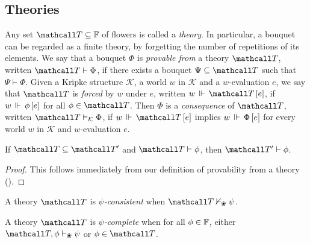 
\subsection{Theories}

\begin{definition}[Theory] 
  
  Any set $\tT \subseteq \flowers$ of flowers is called a \emph{theory}. In
  particular, a bouquet can be regarded as a finite theory, by forgetting the
  number of repetitions of its elements. We say that a bouquet $\Phi$ is
  \emph{provable from} a theory $\tT$, written $\tT \vdash \Phi$, if there exists a
  bouquet $\Psi \subseteq \tT$ such that $\Psi \vdash \Phi$. Given a Kripke
  structure $\mathcal{K}$, a world $w$ in $\mathcal{K}$ and a $w$-evaluation
  $e$, we say that $\tT$ is \emph{forced} by $w$ under $e$, written
  $\eforces{w}{\tT}{e}$, if $w\,\Vdash\,\phi\,[e]$ for all $\phi \in \tT$. Then
  $\Phi$ is a \emph{consequence} of $\tT$, written $\tT \vDash_{\mathcal{K}} \Phi$,
  if $\eforces{w}{\tT}{e}$ implies $w\,\Vdash\,\Phi\,[e]$ for every world $w$ in
  $\mathcal{K}$ and $w$-evaluation $e$.
\end{definition}

\begin{lemma}[Weakening]
  If $\tT \subseteq \tT'$ and $\tT \vdash \phi$, then $\tT' \vdash \phi$.
\end{lemma}
\begin{proof}
  This follows immediately from our definition of provability from a theory
  ().
\end{proof}

\begin{definition}
  A theory $\tT$ is \emph{$\psi$-consistent} when $\tT \nvdash_\Nature \psi$.
\end{definition}

\begin{definition}
  A theory $\tT$ is \emph{$\psi$-complete} when for all $\phi \in \mathbb{F}$,
  either $\tT, \phi \vdash_\Nature \psi$ or $\phi \in \tT$.
\end{definition}


